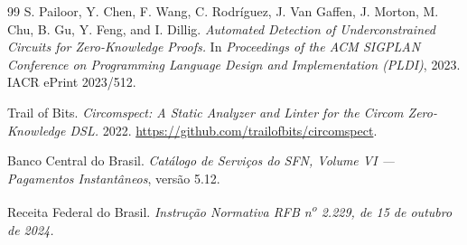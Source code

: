 \documentclass[10pt,twocolumn]{article}
\begin{document}
\begin{thebibliography}{99}
 S. Pailoor, Y. Chen, F. Wang, C. Rodr\'iguez, J. Van
Gaffen, J. Morton, M. Chu, B. Gu, Y. Feng, and I. Dillig. \emph{Automated
Detection of Underconstrained Circuits for Zero-Knowledge Proofs.} In
\emph{Proceedings of the ACM SIGPLAN Conference on Programming Language
Design and Implementation (PLDI)}, 2023. IACR ePrint 2023/512.

 Trail of Bits. \emph{Circomspect: A Static
Analyzer and Linter for the Circom Zero-Knowledge DSL.} 2022.
\url{https://github.com/trailofbits/circomspect}.

 Banco Central do Brasil. \emph{Cat\'alogo de
Servi\c{c}os do SFN, Volume VI --- Pagamentos Instant\^aneos}, vers\~ao
5.12.

 Receita Federal do Brasil. \emph{Instru\c{c}\~ao
Normativa RFB n\textsuperscript{o} 2.229, de 15 de outubro de 2024.}

\end{thebibliography}
\endgroup
\end{document}
